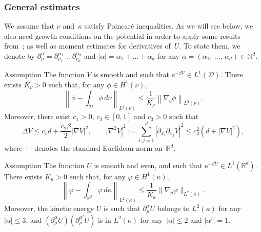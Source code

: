 \documentclass[AHL,Unicode,longabstracts,MathTools,published]{cedram}
\newcommand{\rme}{\mathrm{e}}
\newcommand{\cD}{\mathcal{D}}
\newcommand{\R}{\mathbb{R}}
\newcommand{\bbN}{\mathbb{N}}
\renewcommand{\leq}{\leqslant}
\begin{document}
\subsubsection{General estimates}\label{eq:general_estimates_Langevin}

We assume that $\nu$ and~$\kappa$ satisfy Poincaré inequalities. As we will see below, we also need growth conditions on the potential in order to apply some results from~\cite{DMS15}; as well as moment estimates for derivatives of~$U$. To state them, we denote by $\partial_p^\alpha = \partial_{p_1}^{\alpha_1}\,\dots\, \partial_{p_d}^{\alpha_d}$ and $|\alpha| = \alpha_1 + \dots + \alpha_d$ for any $\alpha = (\alpha_1,\,\dots,\,\alpha_d) \in \bbN^d$.

\begin{enonce}{Assumption}\label{ass:Poincare_nu}
The function $V$ is smooth and such that $\rme^{-\beta V} \in L^1(\cD)$. There exists $K_\nu > 0$ such that, for any $\phi \in H^1(\nu)$,
\[
\left\| \phi - \int_{\cD} \phi \, d\nu \right\|_{L^2(\nu)} \leq \frac{1}{K_\nu}\left\| \nabla_q \phi\right\|_{L^2(\nu)}.
\]
Moreover, there exist $c_1 > 0$, $c_2 \in [0,1]$ and $c_3 > 0$ such that
\begin{equation}\label{eq:regularization condition}
\Delta V \leq c_1 d + \frac {c_2 \beta} 2 \left| \nabla V \right|^2, \qquad \left|\nabla^2 V \right|^2 := \sum_{i,j=1}^d \left|\partial_{x_i}\partial_{x_j}V\right|^2 \leq c_3^2 \left(d + \left| \nabla V \right|^2 \right),
\end{equation}
where~$|\cdot|$ denotes the standard Euclidean norm on~$\R^d$.
\end{enonce}

\begin{enonce}{Assumption}\label{ass:Poincare_kappa}
The function $U$ is smooth and even, and such that $\rme^{-\beta U} \in L^1(\R^d)$. There exists $K_\kappa > 0$ such that, for any $\varphi \in H^1(\kappa)$,
\[
\left\| \varphi - \int_{\R^d} \varphi \, d\kappa \right\|_{L^2(\kappa)} \leq \frac{1}{K_\kappa} \| \nabla_p \varphi \|_{L^2(\kappa)}.
\]
Moreover, the kinetic energy $U$ is such that $\partial_p^\alpha U$ belongs to $L^2(\kappa)$ for any $|\alpha| \leq 3$, and $(\partial_p^{\alpha} U) (\partial_p^{\alpha'} U)$ is in $L^2(\kappa)$ for any~$|\alpha| \leq 2$ and $|\alpha'| = 1$.
\end{enonce}
\end{document}
